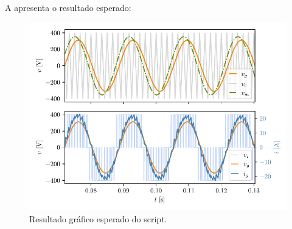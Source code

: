 A  apresenta o resultado esperado:
\begin{figure}[htbp]
    \centering
    \includegraphics[scale=1.0]{figs/inv1}
    \caption{Resultado gráfico esperado do script.}
    \label{fig:plotsinv}
\end{figure}


